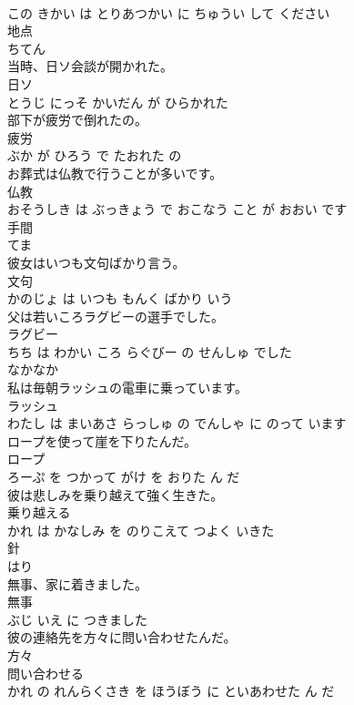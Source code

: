 \documentclass[8pt]{extreport}
\begin{document}
\begin{CJK}{UTF8}{min}
\\	この きかい は とりあつかい に ちゅうい して ください			
\\	地点	
\\	ちてん			
\\	当時、日ソ会談が開かれた。	
\\	日ソ 
\\	とうじ にっそ かいだん が ひらかれた			
\\	部下が疲労で倒れたの。	
\\	疲労 
\\	ぶか が ひろう で たおれた の			
\\	お葬式は仏教で行うことが多いです。	
\\	仏教 
\\	おそうしき は ぶっきょう で おこなう こと が おおい です			
\\	手間	
\\	てま			
\\	彼女はいつも文句ばかり言う。	
\\	文句 
\\	かのじょ は いつも もんく ばかり いう			
\\	父は若いころラグビーの選手でした。	
\\	ラグビー 
\\	ちち は わかい ころ らぐびー の せんしゅ でした			
\\	なかなか	
\\	私は毎朝ラッシュの電車に乗っています。	
\\	ラッシュ 
\\	わたし は まいあさ らっしゅ の でんしゃ に のって います			
\\	ロープを使って崖を下りたんだ。	
\\	ロープ 
\\	ろーぷ を つかって がけ を おりた ん だ			
\\	彼は悲しみを乗り越えて強く生きた。	
\\	乗り越える 
\\	かれ は かなしみ を のりこえて つよく いきた			
\\	針	
\\	はり			
\\	無事、家に着きました。	
\\	無事 
\\	ぶじ いえ に つきました			
\\	彼の連絡先を方々に問い合わせたんだ。	
\\	方々 
\\	問い合わせる 
\\	かれ の れんらくさき を ほうぼう に といあわせた ん だ			

\end{CJK}
\end{document}
